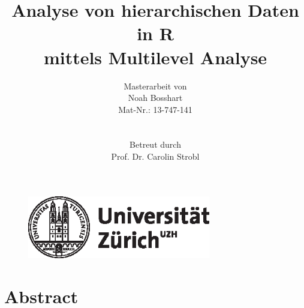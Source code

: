 \documentclass[12pt]{article}\usepackage[]{graphicx}\usepackage[]{color}
\title{Analyse von hierarchischen Daten in R \\ mittels Multilevel Analyse}
\author{Masterarbeit von \\ Noah Bosshart \\ Mat-Nr.: 13-747-141 \\ \\ \\ Betreut durch \\ Prof. Dr. Carolin Strobl}
\begin{document}

\begin{figure}[t]
  \centering
  \includegraphics[width = 8cm]{uzh_logo}
\end{figure}

\maketitle
\thispagestyle{empty}

\newpage
{}
\tableofcontents

\newpage
\listoffigures

\newpage
\listoftables
\newpage


\section{Abstract}
\newpage

\end{document}
